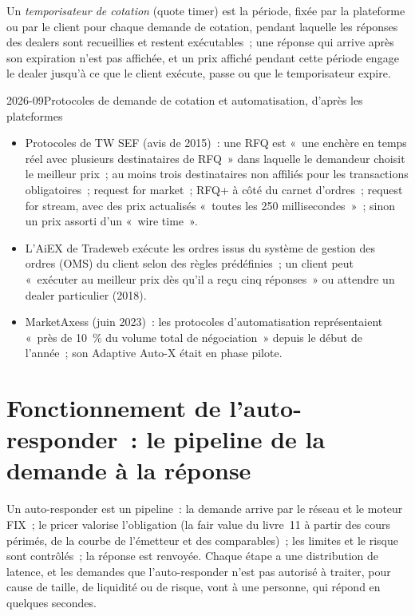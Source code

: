 \begin{definition}\label{def:nw:fixed-income-and-rfq-platform-connectivity:timer}
Un \emph{temporisateur de cotation} (quote timer) est la période, fixée par la plateforme ou par le client pour chaque demande de cotation, pendant
laquelle les réponses des dealers sont recueillies et restent exécutables~; une réponse qui arrive après son expiration n'est pas affichée, et un prix
affiché pendant cette période engage le dealer jusqu'à ce que le client exécute, passe ou que le temporisateur expire.
\end{definition}

\begin{dated}{2026-09}{Protocoles de demande de cotation et automatisation, d'après les plateformes}\label{dat:nw:fixed-income-and-rfq-platform-connectivity:platforms}
\begin{itemize}
\item Protocoles de TW SEF (avis de 2015)~: une RFQ est «~une enchère en temps réel avec plusieurs destinataires de RFQ~» dans laquelle le
  demandeur choisit le meilleur prix~; au moins trois destinataires non affiliés pour les transactions obligatoires~; request for market~; RFQ+
  à côté du carnet d'ordres~; request for stream, avec des prix actualisés «~toutes les 250 millisecondes~»~; sinon un prix assorti d'un «~wire
  time~».
\item L'AiEX de Tradeweb exécute les ordres issus du système de gestion des ordres (OMS) du client selon des règles prédéfinies~; un client peut «~exécuter au
  meilleur prix dès qu'il a reçu cinq réponses~» ou attendre un dealer particulier (2018).
\item MarketAxess (juin 2023)~: les protocoles d'automatisation représentaient «~près de 10~\% du volume total de négociation~» depuis le début de l'année~; son Adaptive
  Auto-X était en phase pilote.
\end{itemize}
\end{dated}

\section{Fonctionnement de l'auto-responder~: le pipeline de la demande à la réponse}

Un auto-responder est un pipeline~: la demande arrive par le réseau et le moteur FIX~; le pricer valorise l'obligation (la fair value du livre~11 à partir des
cours périmés, de la courbe de l'émetteur et des comparables)~; les limites et le risque sont contrôlés~; la réponse est renvoyée. Chaque étape
a une distribution de latence, et les demandes que l'auto-responder n'est pas autorisé à traiter, pour cause de taille, de liquidité ou de risque, vont à
une personne, qui répond en quelques secondes.

